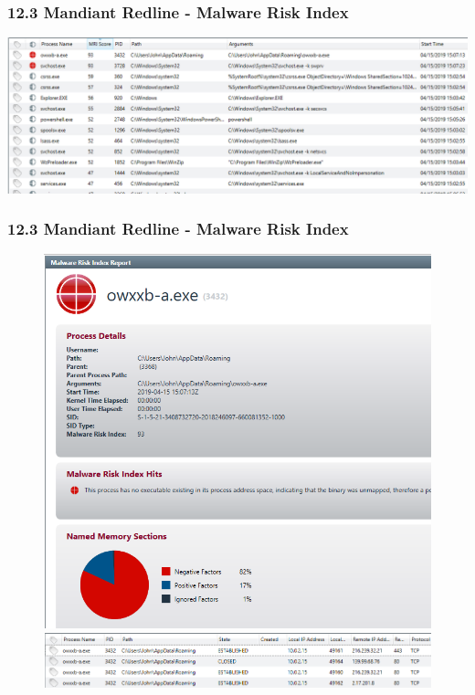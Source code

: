 \begin{frame}
  \frametitle{12.3 Mandiant Redline - Malware Risk Index}
  \includegraphics[scale=0.38]{images/f12_redline-1.png}
\end{frame}

\begin{frame}
  \frametitle{12.3 Mandiant Redline - Malware Risk Index}
  \begin{figure}
    \begin{center}
      \includegraphics[scale=0.28]{images/f12_redline-2.png}

      \vspace{0.2cm}

      \includegraphics[scale=0.35]{images/f12_redline-3.png}
    \end{center}
  \end{figure}
\end{frame}

